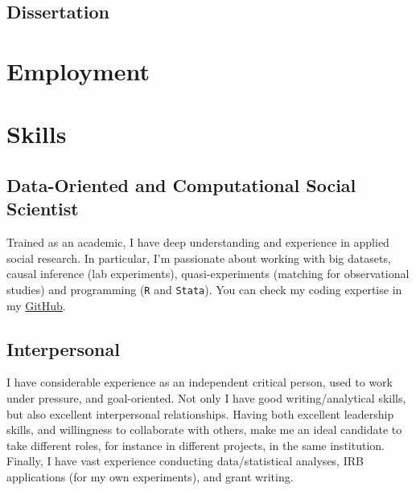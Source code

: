 \documentclass[letterpaper]{article}
\begin{document}
{\unskip}

\subsection*{Dissertation}

  {\unskip}


\section*{Employment}

{\unskip}



\section*{Skills}

\subsection*{Data-Oriented and Computational Social Scientist}
Trained as an academic, I have deep understanding and experience in applied social research. In particular, I'm passionate about working with big datasets, causal inference (lab experiments), quasi-experiments (matching for observational studies) and programming (\texttt{R} and \texttt{Stata}). You can check my coding expertise in my \href{https://github.com/hbahamonde}{GitHub}.

\subsection*{Interpersonal}
I have considerable experience as an independent critical person, used to work under pressure, and goal-oriented. Not only I have good writing/analytical skills, but also excellent interpersonal relationships. Having both excellent leadership skills, and willingness to collaborate with others, make me an ideal candidate to take different roles, for instance in different projects, in the same institution. Finally, I have vast experience conducting data/statistical analyses, IRB applications (for my own experiments), and grant writing.
\end{document}
